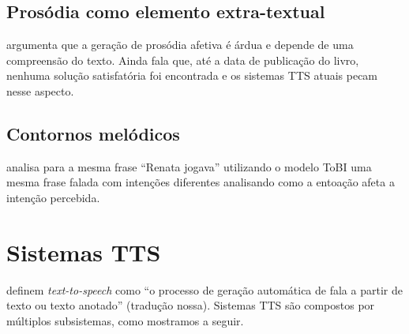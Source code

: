 \subsection{Prosódia como elemento extra-textual}
 argumenta que a geração de prosódia afetiva é árdua e
depende de uma compreensão do texto. Ainda fala que, até a data de publicação do
livro, nenhuma solução satisfatória foi encontrada e os sistemas TTS atuais
pecam nesse aspecto.

\subsection{Contornos melódicos}
 analisa para a mesma frase ``Renata jogava'' utilizando
o modelo ToBI uma mesma frase falada com intenções diferentes analisando como a
entoação afeta a intenção percebida.

\section{Sistemas TTS}
 definem \emph{text-to-speech} como ``o processo de geração
automática de fala a partir de texto ou texto anotado'' (tradução nossa).
Sistemas TTS são compostos por múltiplos subsistemas, como mostramos a seguir.

